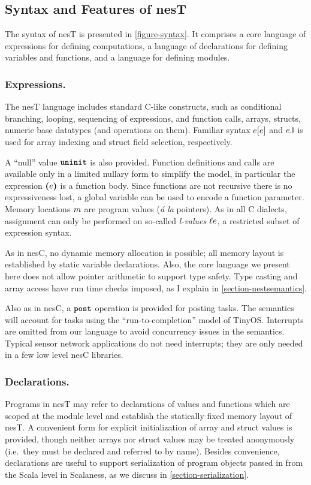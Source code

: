 \subsection{Syntax and Features of nesT}

The syntax of nesT is presented in \autoref{figure-syntax}. It comprises a core language of
expressions for defining computations, a language of declarations for defining variables and
functions, and a language for defining modules.

\semanticssyntaxfig

\coresemanticsfig

\subsubsection{Expressions.}
The nesT language includes standard C-like constructs, such as conditional branching, looping,
sequencing of expressions, and function calls, arrays, structs, numeric base datatypes (and
operations on them). Familiar syntax $e [e]$ and $e.\textsf{l}$ is used for array indexing and
struct field selection, respectively.

A ``null'' value $\mbox{\bf \texttt{uninit}}$ is also provided. Function definitions and calls are available only
in a limited nullary form to simplify the model, in particular the expression $\textbf{(}e\textbf{)}$ is a
function body. Since functions are not recursive there is no expressiveness lost, a global
variable can be used to encode a function parameter. Memory locations $m$ are program
values (\emph{\'a la} pointers). As in all C dialects, assignment can only be performed on
so-called \emph{l-values} $\ell e$, a restricted subset of expression syntax.

As in nesC, no dynamic memory allocation is possible; all memory layout is established by static
variable declarations. Also, the core language we present here does not allow pointer arithmetic
to support type safety. Type casting and array access have run time checks imposed, as I explain
in \autoref{section-nestsemantics}.

Also as in nesC, a $\mbox{\bf \texttt{post}}$ operation is provided for posting tasks. The semantics will account
for tasks using the ``run-to-completion'' model of TinyOS. Interrupts are omitted from our
language to avoid concurrency issues in the semantics. Typical sensor network applications do
not need interrupts; they are only needed in a few low level nesC libraries.

\subsubsection{Declarations.}
Programs in nesT may refer to declarations of values and functions which are scoped at the
module level and establish the statically fixed memory layout of nesT. A convenient form for
explicit initialization of array and struct values is provided, though neither arrays nor struct
values may be treated anonymously (i.e.~they must be declared and referred to by name). Besides
convenience, declarations are useful to support serialization of program objects passed in from
the Scala level in Scalaness, as we discuss in \autoref{section-serialization}.

